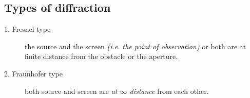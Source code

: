 \documentclass[legalpaper,10pt]{article}
\begin{document}
\begin{multicols*}{2}
		\subsection*{Types of diffraction}
	\begin{description}
		\item[1. Fresnel type] the source and the screen \textit{(i.e. the point of observation)} or both are at finite distance from the obstacle or the aperture.
			\item[2. Fraunhofer type]  both source and screen are \textit{at $\infty$ distance }from each other.
		\end{description}
		
	\end{multicols*}
\end{document}
